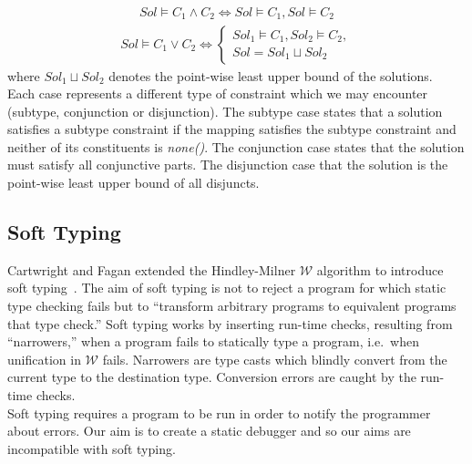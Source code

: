 \documentclass[12pt, titlepage]{article}
\begin{document}
\begin{align*} 
	Sol \models C_1 \land C_2 \iff Sol \models C_1, Sol \models  C_2
\end{align*}
\begin{align*} 
	Sol \models C_1 \lor C_2 \iff \begin{cases} Sol_1 \models C_1, Sol_2 \models C_2, \\
	                                            Sol = Sol_1 \sqcup Sol_2 \end{cases}
\end{align*}
where $Sol_1 \sqcup Sol_2$ denotes the point-wise least upper bound of the solutions. \\
Each case represents a different type of constraint which we may encounter (subtype, conjunction or disjunction). The subtype case states that a solution satisfies a subtype constraint if the mapping satisfies the subtype constraint and neither of its constituents is \textit{none()}. The conjunction case states that the solution must satisfy all conjunctive parts. The disjunction case that the solution is the point-wise least upper bound of all disjuncts.

\subsection{Soft Typing}
Cartwright and Fagan extended the Hindley-Milner $\mathcal{W}$ algorithm to introduce soft typing~\cite{cartwright91}. The aim of soft typing is not to reject a program for which static type checking fails but to ``transform arbitrary programs to equivalent programs that type check.'' Soft typing works by inserting run-time checks, resulting from ``narrowers,'' when a program fails to statically type a program, i.e.\ when unification in $\mathcal{W}$ fails. Narrowers are type casts which blindly convert from the current type to the destination type. Conversion errors are caught by the run-time checks. \\
Soft typing requires a program to be run in order to notify the programmer about errors. Our aim is to create a static debugger and so our aims are incompatible with soft typing.
\end{document}
